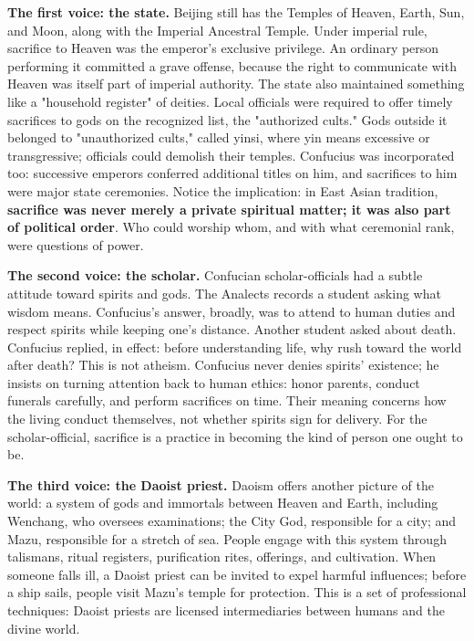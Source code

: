 \textbf{The first voice: the state.} Beijing still has the Temples of Heaven, Earth, Sun, and Moon, along with the Imperial Ancestral Temple. Under imperial rule, sacrifice to Heaven was the emperor's exclusive privilege. An ordinary person performing it committed a grave offense, because the right to communicate with Heaven was itself part of imperial authority. The state also maintained something like a "household register" of deities. Local officials were required to offer timely sacrifices to gods on the recognized list, the "authorized cults." Gods outside it belonged to "unauthorized cults," called yinsi, where yin means excessive or transgressive; officials could demolish their temples. Confucius was incorporated too: successive emperors conferred additional titles on him, and sacrifices to him were major state ceremonies. Notice the implication: in East Asian tradition, \textbf{sacrifice was never merely a private spiritual matter; it was also part of political order}. Who could worship whom, and with what ceremonial rank, were questions of power.

\textbf{The second voice: the scholar.} Confucian scholar-officials had a subtle attitude toward spirits and gods. The Analects records a student asking what wisdom means. Confucius's answer, broadly, was to attend to human duties and respect spirits while keeping one's distance. Another student asked about death. Confucius replied, in effect: before understanding life, why rush toward the world after death? This is not atheism. Confucius never denies spirits' existence; he insists on turning attention back to human ethics: honor parents, conduct funerals carefully, and perform sacrifices on time. Their meaning concerns how the living conduct themselves, not whether spirits sign for delivery. For the scholar-official, sacrifice is a practice in becoming the kind of person one ought to be.

\textbf{The third voice: the Daoist priest.} Daoism offers another picture of the world: a system of gods and immortals between Heaven and Earth, including Wenchang, who oversees examinations; the City God, responsible for a city; and Mazu, responsible for a stretch of sea. People engage with this system through talismans, ritual registers, purification rites, offerings, and cultivation. When someone falls ill, a Daoist priest can be invited to expel harmful influences; before a ship sails, people visit Mazu's temple for protection. This is a set of professional techniques: Daoist priests are licensed intermediaries between humans and the divine world.

